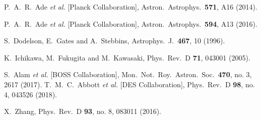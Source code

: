 \documentclass[aps,prd,nofootinbib,amsmath,amssymb,twocolumn,superscriptaddress,10pt]{revtex4}%
\begin{document}
\begin{thebibliography}{}
  P.~A.~R.~Ade {\it et al.} [Planck Collaboration],
  Astron.\ Astrophys.\  {\bf 571}, A16 (2014).

  P.~A.~R.~Ade {\it et al.} [Planck Collaboration],
  Astron.\ Astrophys.\  {\bf 594}, A13 (2016).




  S.~Dodelson, E.~Gates and A.~Stebbins,
  Astrophys.\ J.\  {\bf 467}, 10 (1996).


  K.~Ichikawa, M.~Fukugita and M.~Kawasaki,
  Phys.\ Rev.\ D {\bf 71}, 043001 (2005).


  S.~Alam {\it et al.} [BOSS Collaboration],
  Mon.\ Not.\ Roy.\ Astron.\ Soc.\  {\bf 470}, no. 3, 2617 (2017).
  T.~M.~C.~Abbott {\it et al.} [DES Collaboration],
  Phys.\ Rev.\ D {\bf 98}, no. 4, 043526 (2018).



  X.~Zhang,
  Phys.\ Rev.\ D {\bf 93}, no. 8, 083011 (2016).


\end{thebibliography}
\end{document}
